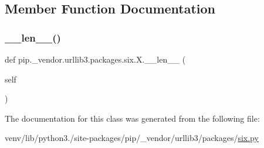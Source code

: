 \subsection{Member Function Documentation}
\mbox{\label{classpip_1_1__vendor_1_1urllib3_1_1packages_1_1six_1_1X_ac82809ac01719c1af7d67fdd66455862}} 
\subsubsection{\texorpdfstring{\+\_\+\+\_\+len\+\_\+\+\_\+()}{\_\_len\_\_()}}
{\footnotesize\ttfamily def pip.\+\_\+vendor.\+urllib3.\+packages.\+six.\+X.\+\_\+\+\_\+len\+\_\+\+\_\+ (\begin{DoxyParamCaption}\item[{}]{self }\end{DoxyParamCaption})}



The documentation for this class was generated from the following file\+:\begin{DoxyCompactItemize}
\item 
venv/lib/python3./site-\/packages/pip/\+\_\+vendor/urllib3/packages/\hyperlink{pip_2__vendor_2urllib3_2packages_2six_8py}{six.\+py}\end{DoxyCompactItemize}

